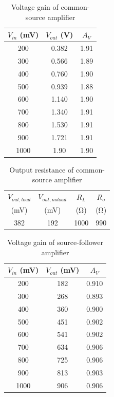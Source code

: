 \begin{table}[hbtp]
  \centering
  \begin{tabular}{ccc}
    $V_{in}$ (\si{mV}) & $V_{out}$ (\si{V}) & $A_V$ \\
    \hline
    200                & 0.382              & 1.91  \\
    300                & 0.566              & 1.89  \\
    400                & 0.760              & 1.90  \\
    500                & 0.939              & 1.88  \\
    600                & 1.140              & 1.90  \\
    700                & 1.340              & 1.91  \\
    800                & 1.530              & 1.91  \\
    900                & 1.721              & 1.91  \\
    1000               & 1.90               & 1.90  \\
  \end{tabular}
  \caption{\label{tab:common-source} Voltage gain of common-source amplifier}
\end{table}

\begin{table}[hbtp]
  \centering
  \begin{tabular}{cccc}
    $V_{out,load}$ & $V_{out,no load}$ & $R_L$       & $R_o$       \\
    (\si{mV})      & (\si{mV})         & (\si{\ohm}) & (\si{\ohm}) \\
    \hline
    382            & 192               & 1000        & 990         \\
    \end{tabular}
    \caption{\label{tab:ro_common} Output resistance of common-source amplifier}
\end{table}

\begin{table}[hbtp]
  \centering
  \begin{tabular}{ccc}
    $V_{in}$ (\si{mV}) & $V_{out}$ (\si{mV}) & $A_V$ \\
    \hline
    200                & 182                 & 0.910 \\
    300                & 268                 & 0.893 \\
    400                & 360                 & 0.900 \\
    500                & 451                 & 0.902 \\
    600                & 541                 & 0.902 \\
    700                & 634                 & 0.906 \\
    800                & 725                 & 0.906 \\
    900                & 813                 & 0.903 \\
    1000               & 906                 & 0.906 \\
  \end{tabular}
  \caption{\label{tab:source-follower} Voltage gain of source-follower amplifier}
\end{table}

